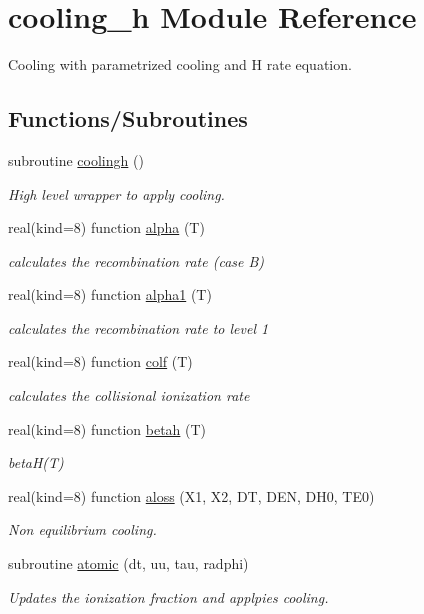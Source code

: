 \hypertarget{namespacecooling__h}{}\section{cooling\+\_\+h Module Reference}
\label{namespacecooling__h}


Cooling with parametrized cooling and H rate equation.  


\subsection*{Functions/\+Subroutines}
\begin{DoxyCompactItemize}
\item 
subroutine \hyperlink{namespacecooling__h_aee85faa3b36e05a8efb05c1588f34ef2}{coolingh} ()
\begin{DoxyCompactList}\small\item\em High level wrapper to apply cooling. \end{DoxyCompactList}\item 
real(kind=8) function \hyperlink{namespacecooling__h_a09de30645cebf531a647b5f53ae143b2}{alpha} (T)
\begin{DoxyCompactList}\small\item\em calculates the recombination rate (case B) \end{DoxyCompactList}\item 
real(kind=8) function \hyperlink{namespacecooling__h_a5454f21ef468add797c58753a1e0c773}{alpha1} (T)
\begin{DoxyCompactList}\small\item\em calculates the recombination rate to level 1 \end{DoxyCompactList}\item 
real(kind=8) function \hyperlink{namespacecooling__h_ad5f1352f8925ccb1b352d6e749465a92}{colf} (T)
\begin{DoxyCompactList}\small\item\em calculates the collisional ionization rate \end{DoxyCompactList}\item 
real(kind=8) function \hyperlink{namespacecooling__h_a2a2de25572bd515eae9441391e0ed0f8}{betah} (T)
\begin{DoxyCompactList}\small\item\em beta\+H(\+T) \end{DoxyCompactList}\item 
real(kind=8) function \hyperlink{namespacecooling__h_a92cfd14c9b02e853eb33d22857fabeed}{aloss} (X1, X2, D\+T, D\+E\+N, D\+H0, T\+E0)
\begin{DoxyCompactList}\small\item\em Non equilibrium cooling. \end{DoxyCompactList}\item 
subroutine \hyperlink{namespacecooling__h_aef95dbca5e7aef78d66a225cc217c982}{atomic} (dt, uu, tau, radphi)
\begin{DoxyCompactList}\small\item\em Updates the ionization fraction and applpies cooling. \end{DoxyCompactList}\end{DoxyCompactItemize}


